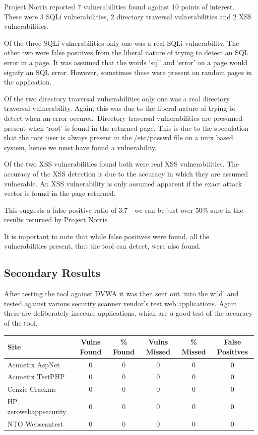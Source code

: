 \documentclass[12pt,a4paper]{article}
\begin{document}
Project Norris reported 7 vulnerabilities found against 10 points of interest.  These were 3 SQLi vulnerabilities, 2 directory traversal vulnerabilities and 2 XSS vulnerabilities.

Of the three SQLi vulnerabilities only one was a real SQLi vulnerability.  The other two were false positives from the liberal nature of trying to detect an SQL error in a page.  It was assumed that the words `sql' and `error' on a page would signify an SQL error.  However, sometimes these were present on random pages in the application.

Of the two directory traversal vulnerabilities only one was a real directory traversal vulnerability.  Again, this was due to the liberal nature of trying to detect when an error occured.  Directory traversal vulnerabilities are presumed present when `root' is found in the returned page.  This is due to the speculation that the root user is always present in the /etc/passwd file on a unix based system, hence we must have found a vulnerability.

Of the two XSS vulnerabilities found both were real XSS vulnerabilities.  The accuracy of the XSS detection is due to the accuracy in which they are assumed vulnerable.  An XSS vulnerability is only assumed apparent if the exact attack vector is found in the page returned.

This suggests a false positive ratio of 3:7 - we can be just over 50\% sure in the results returned by Project Norris.

It is important to note that while false positives were found, all the vulnerabilities present, that the tool can detect, were also found.

\subsection{Secondary Results}
After testing the tool against DVWA it was then sent out `into the wild' and tested against various security scanner vendor's test web applications.  Again these are deliberately insecure applications, which are a good test of the accuracy of the tool.  

\begin{center}
    \begin{tabular}{ | l | c | c | c | c | c | }
        \hline
        Site & Vulns Found & \% Found & Vulns Missed & \% Missed & False Positives  \\ \hline
        Acunetix AspNet & 0 & 0 & 0 & 0 & 0 \\ \hline
        Acunetix TestPHP & 0 & 0 & 0 & 0 & 0 \\ \hline
        Cenzic Crackme & 0 & 0 & 0 & 0 & 0 \\ \hline
        HP zerowebappsecurity & 0 & 0 & 0 & 0 & 0 \\ \hline
        NTO Webscantest & 0 & 0 & 0 & 0 & 0 \\
        \hline
    \end{tabular}
\end{center}
\end{document}
